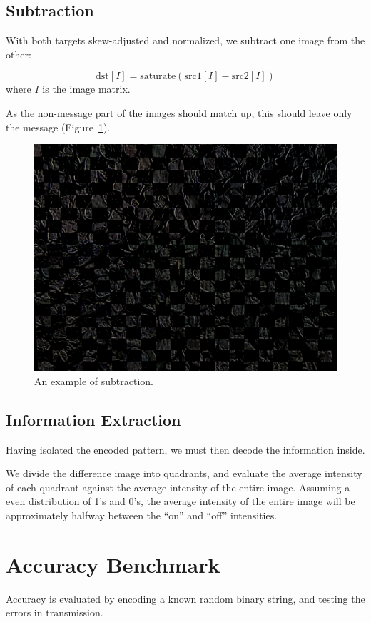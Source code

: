 \documentclass[11pt, letterpaper]{article}
\begin{document}
\subsection{Subtraction}
With both targets skew-adjusted and normalized, we subtract one image from the other:

$$\text{dst}[I] = \text{saturate}(\text{src1}[I] - \text{src2}[I])$$ where $I$ is the image matrix\cite{opencv_subtraction}.

As the non-message part of the images should match up, this should leave only the message (Figure~\ref{fig:subtract}).

\begin{figure}[hbtp]
\centering
\includegraphics[scale=0.2]{img/subtract.png}
\caption{An example of subtraction.}
\label{fig:subtract}
\end{figure}

\subsection{Information Extraction}
Having isolated the encoded pattern, we must then decode the information inside.

We divide the difference image into quadrants, and evaluate the average intensity of each quadrant against the average intensity of the entire image.
Assuming a even distribution of 1's and 0's, the average intensity of the entire image will be approximately halfway between the ``on'' and ``off'' intensities.

\section{Accuracy Benchmark}
Accuracy is evaluated by encoding a known random binary string, and testing the errors in transmission.
\end{document}

